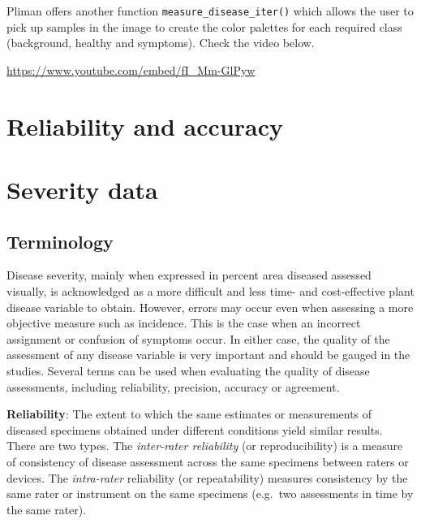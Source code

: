 \documentclass[
  letterpaper,
]{book}
\begin{document}
Pliman offers another function \texttt{measure\_disease\_iter()} which
allows the user to pick up samples in the image to create the color
palettes for each required class (background, healthy and symptoms).
Check the video below.

\url{https://www.youtube.com/embed/fI_Mm-GlPyw}

\hypertarget{reliability-and-accuracy}{%
\chapter{Reliability and accuracy}\label{reliability-and-accuracy}}

\hypertarget{severity-data}{%
\chapter{Severity data}\label{severity-data}}

\hypertarget{terminology}{%
\section{Terminology}\label{terminology}}

Disease severity, mainly when expressed in percent area diseased
assessed visually, is acknowledged as a more difficult and less time-
and cost-effective plant disease variable to obtain. However, errors may
occur even when assessing a more objective measure such as incidence.
This is the case when an incorrect assignment or confusion of symptoms
occur. In either case, the quality of the assessment of any disease
variable is very important and should be gauged in the studies. Several
terms can be used when evaluating the quality of disease assessments,
including reliability, precision, accuracy or agreement.

\textbf{Reliability}: The extent to which the same estimates or
measurements of diseased specimens obtained under different conditions
yield similar results. There are two types. The \emph{inter-rater
reliability} (or reproducibility) is a measure of consistency of disease
assessment across the same specimens between raters or devices. The
\emph{intra-rater} reliability (or repeatability) measures consistency
by the same rater or instrument on the same specimens (e.g.~two
assessments in time by the same rater).
\end{document}
